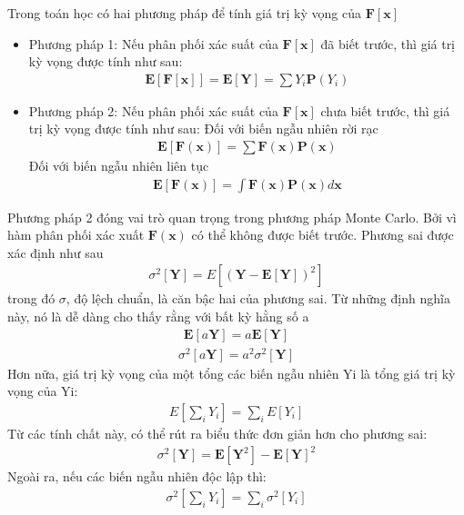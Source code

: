 Trong toán học có hai phương pháp để tính giá trị kỳ vọng của $\textbf{F}[\textbf{x}]$ 
\begin{itemize}
	\item Phương pháp 1: Nếu phân phối xác suất của $\textbf{F}[\textbf{x}]$ đã biết trước, thì giá trị kỳ vọng được tính như sau:
	\begin{align}
		\textbf{E}[\textbf{F}[\textbf{x}]]=\textbf{E}[\textbf{Y}]=\sum{Y_i\textbf{P}(Y_i)}
	\end{align}
	\item Phương pháp 2: Nếu phân phối xác suất của $\textbf{F}[\textbf{x}]$ chưa biết trước, thì giá trị kỳ vọng được tính như sau: 
	Đối với biến ngẫu nhiên rời rạc
	\begin{align}
		\textbf{E}[\textbf{F}(\textbf{x})]=\sum{\textbf{F}(\textbf{x})\textbf{P}(\textbf{x})}
	\end{align}
	Đối với biến ngẫu nhiên liên tục
	\begin{align}
		\textbf{E}[\textbf{F}(\textbf{x})]=\int{\textbf{F}(\textbf{x})\textbf{P}(\textbf{x})d\textbf{x}}
	\end{align}
\end{itemize}
Phương pháp 2 đóng vai trò quan trọng trong phương pháp Monte Carlo. 
Bởi vì hàm phân phối xác xuất $\textbf{F}(\textbf{x})$ có thể không được biết trước.
Phương sai được xác định như sau
\begin{align}
	\sigma^2[\textbf{Y}]=E[(\textbf{Y}-\textbf{E}[\textbf{Y}])^2]
\end{align}
trong đó $\sigma$, độ lệch chuẩn, là căn bậc hai của phương sai. 
Từ những định nghĩa này, nó là dễ dàng cho thấy rằng với bất kỳ hằng số a
\begin{align}
	\textbf{E}[a\textbf{Y}]=a\textbf{E}[\textbf{Y}]
\end{align}
\begin{align}
	\sigma^2[a\textbf{Y}]=a^2\sigma^2[\textbf{Y}]
\end{align}
Hơn nữa, giá trị kỳ vọng của một tổng các biến ngẫu nhiên Yi là tổng giá trị kỳ vọng của Yi:
\begin{align}
	E\left[\sum_i{Y_i}\right]=\sum_i{E[Y_i]}
\end{align}
Từ các tính chất này, có thể rút ra biểu thức đơn giản hơn cho phương sai:
\begin{align}
	\sigma^2[\textbf{Y}]=\textbf{E}[\textbf{Y}^2]-\textbf{E}[\textbf{Y}]^2
\end{align}
Ngoài ra, nếu các biến ngẫu nhiên độc lập thì:
\begin{align}
	\sigma^2\left[\sum_i{Y_i}\right]=\sum_i{\sigma^2[Y_i]}\label{ct1.17}
\end{align}
